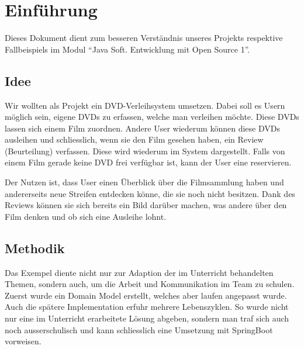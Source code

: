 \chapter{Einführung}
\label{chap:introduction}
Dieses Dokument dient zum besseren Verständnis unseres Projekts respektive Fallbeispiels im Modul \enquote{Java Soft. Entwicklung mit Open Source 1}. 


\section{Idee}
Wir wollten als Projekt ein DVD-Verleihsystem umsetzen. Dabei soll es Usern möglich sein, eigene DVDs zu erfassen, welche man verleihen möchte. Diese DVDs lassen sich einem Film zuordnen. Andere User wiederum können diese DVDs ausleihen und schliesslich, wenn sie den Film gesehen haben, ein Review (Beurteilung) verfassen. Diese wird wiederum im System dargestellt. Falls von einem Film gerade keine DVD frei verfügbar ist, kann der User eine reservieren. 

Der Nutzen ist, dass User einen Überblick über die Filmsammlung haben und andererseits neue Streifen entdecken könne, die sie noch nicht besitzen. Dank des Reviews können sie sich bereits ein Bild darüber machen, was andere über den Film denken und ob sich eine Ausleihe lohnt.

\section{Methodik}
Das Exempel diente nicht nur zur Adaption der im Unterricht behandelten Themen, sondern auch, um die Arbeit und Kommunikation im Team zu schulen. Zuerst wurde ein Domain Model erstellt, welches aber laufen angepasst wurde. Auch die spätere Implementation erfuhr mehrere Lebenszyklen. So wurde nicht nur eine im Unterricht erarbeitete Lösung abgeben, sondern man traf sich auch noch ausserschulisch und kann schliesslich eine Umsetzung mit SpringBoot vorweisen.
